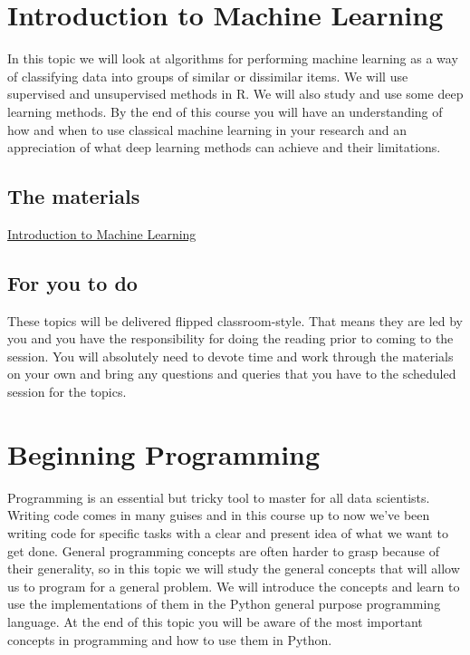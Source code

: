 \documentclass[
]{book}
\begin{document}
\hypertarget{introduction-to-machine-learning}{%
\chapter{Introduction to Machine Learning}\label{introduction-to-machine-learning}}

In this topic we will look at algorithms for performing machine learning as a way of classifying data into groups of similar or dissimilar items. We will use supervised and unsupervised methods in R. We will also study and use some deep learning methods. By the end of this course you will have an understanding of how and when to use classical machine learning in your research and an appreciation of what deep learning methods can achieve and their limitations.

\hypertarget{the-materials-4}{%
\section{The materials}\label{the-materials-4}}

\href{https://danmaclean.github.io/intro_to_ml/}{Introduction to Machine Learning}

\hypertarget{for-you-to-do-4}{%
\section{For you to do}\label{for-you-to-do-4}}

These topics will be delivered flipped classroom-style. That means they are led by you and you have the responsibility for doing the reading prior to coming to the session. You will absolutely need to devote time and work through the materials on your own and bring any questions and queries that you have to the scheduled session for the topics.

\hypertarget{beginning-programming}{%
\chapter{Beginning Programming}\label{beginning-programming}}

Programming is an essential but tricky tool to master for all data scientists. Writing code comes in many guises and in this course up to now we've been writing code for specific tasks with a clear and present idea of what we want to get done. General programming concepts are often harder to grasp because of their generality, so in this topic we will study the general concepts that will allow us to program for a general problem. We will introduce the concepts and learn to use the implementations of them in the Python general purpose programming language. At the end of this topic you will be aware of the most important concepts in programming and how to use them in Python.
\end{document}
